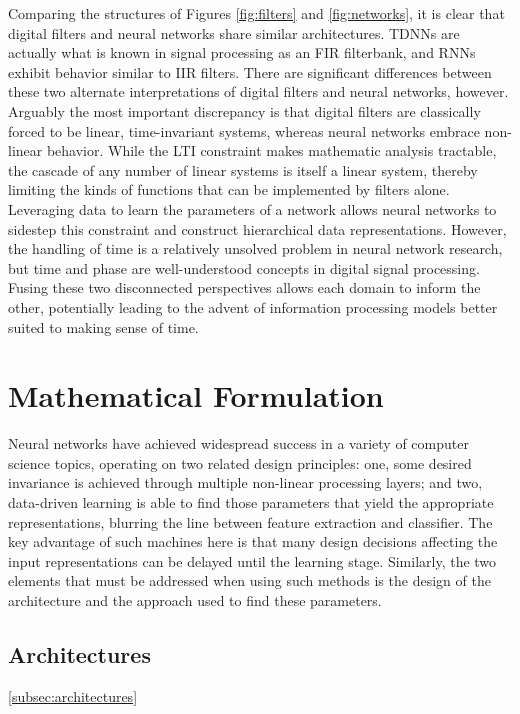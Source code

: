 Comparing the structures of Figures \ref{fig:filters} and \ref{fig:networks}, it is clear that digital filters and neural networks share similar architectures.
TDNNs are actually what is known in signal processing as an FIR filterbank, and RNNs exhibit behavior similar to IIR filters.
There are significant differences between these two alternate interpretations of digital filters and neural networks, however.
Arguably the most important discrepancy is that digital filters are classically forced to be linear, time-invariant systems, whereas neural networks embrace non-linear behavior.
While the LTI constraint makes mathematic analysis tractable, the cascade of any number of linear systems is itself a linear system, thereby limiting the kinds of functions that can be implemented by filters alone.
Leveraging data to learn the parameters of a network allows neural networks to sidestep this constraint and construct hierarchical data representations.
However, the handling of time is a relatively unsolved problem in neural network research, but time and phase are well-understood concepts in digital signal processing.
Fusing these two disconnected perspectives allows each domain to inform the other, potentially leading to the advent of information processing models better suited to making sense of time.


\section{Mathematical Formulation}
\label{sec:example}

Neural networks have achieved widespread success in a variety of computer science topics, operating on two related design principles:
one, some desired invariance is achieved through multiple non-linear processing layers;
and two, data-driven learning is able to find those parameters that yield the appropriate representations, blurring the line between feature extraction and classifier.
The key advantage of such machines here is that many design decisions affecting the input representations can be delayed until the learning stage.
Similarly, the two elements that must be addressed when using such methods is the design of the architecture and the approach used to find these parameters.


\subsection{Architectures}
\ref{subsec:architectures}

